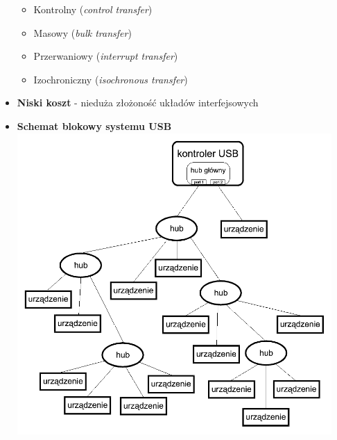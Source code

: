 \begin{itemize}
\begin{itemize}
					\item Kontrolny (\emph{control transfer})
					\item Masowy (\emph{bulk transfer})
					\item Przerwaniowy (\emph{interrupt transfer})
					\item Izochroniczny (\emph{isochronous transfer})
				\end{itemize}
			\item \textbf{Niski koszt} - nieduża złożoność układów interfejsowych
			\item \textbf{Schemat blokowy systemu USB}\\
			\includegraphics[width=12cm]{./wyklady/USB_6_1.pdf}
		\end{itemize}
